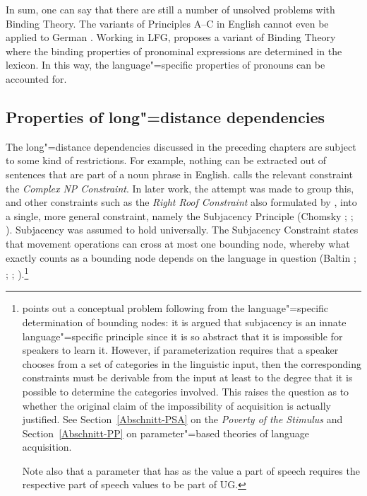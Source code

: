 In sum, one can say that there are still a number of unsolved problems with Binding Theory. The
\hpsg variants of Principles A--C in English cannot
even be applied to German \citep[Chapter~20]{Mueller99a}. Working in LFG, \citet{Dalrymple93a} proposes a variant of Binding Theory where the binding
properties of pronominal expressions are determined in the lexicon. In this way, the language"=specific properties of pronouns can be accounted for.

\subsection{Properties of long"=distance dependencies}
\label{Abschnitt-Fernabhängigkeiten}

The 
long"=distance dependencies discussed in the preceding chapters are subject
to some kind of restrictions. For example, nothing can be extracted out of sentences that are part of a noun phrase in English. \citet[]{Ross67} calls the relevant constraint the \emph{Complex NP Constraint}. In later work, the attempt was made to group this, and other constraints such as the
\emph{Right Roof Constraint} also formulated by  \citet[Section~5.1.2]{Ross67}, into a single, more general constraint, namely the Subjacency Principle
	(Chomsky \citeyear[]{Chomsky73a}; \citeyear[]{Chomsky86b}; \citealp{Baltin81a,Baltin2006a}).
Subjacency was assumed to hold universally.
The Subjacency Constraint states that movement operations can cross at most one bounding node, whereby what exactly counts as a bounding node
depends on the language in question (Baltin \citeyear[]{Baltin81a};
\citeyear{Baltin2006a}; \citealp[]{Rizzi82b}; \citealp[--40]{Chomsky86b}).\footnote{
	 \citet[--540]{Newmeyer2004a} points out a conceptual problem following from the language"=specific determination of bounding nodes: it is argued
	 that subjacency is an innate language"=specific principle since it is so abstract that it is impossible for speakers to learn it. However, if parameterization
	 requires that a speaker chooses from  a set of categories in the linguistic input, then the corresponding constraints must be derivable from the input at least to
	 the degree that it is possible to determine the categories involved. This raises the question as to whether the original claim of the impossibility of acquisition
	 is actually justified. See Section~\ref{Abschnitt-PSA} on the  \emph{Poverty of the Stimulus}
	 and Section~\ref{Abschnitt-PP} on parameter"=based theories of language
         acquisition.

         Note also that a parameter that has as the value a part of speech requires the respective
         part of speech values to be part of UG.
}

